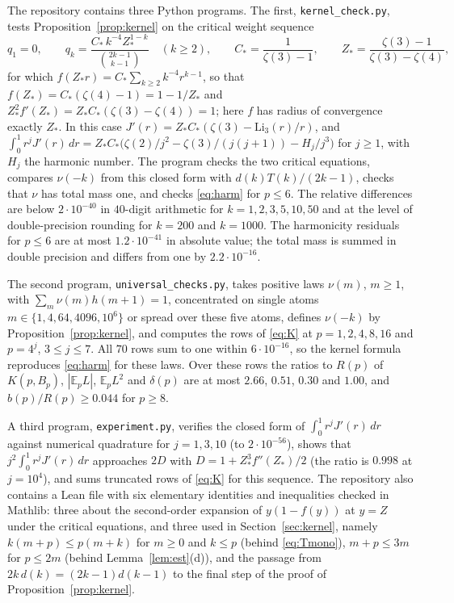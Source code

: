 \documentclass[11pt]{amsart}
\theoremstyle{remark}
\numberwithin{equation}{section}
\newcommand{\E}{\mathbb E}
\newcommand{\1}{\mathbf 1}
\begin{document}
The repository \cite{code} contains three Python programs. The first, \texttt{kernel\_check.py}, tests Proposition~\ref{prop:kernel} on the critical weight sequence
\[
q_1=0,\qquad q_k=\frac{C_*\,k^{-4}Z_*^{1-k}}{\binom{2k-1}{k-1}}\quad(k\ge2),\qquad C_*=\frac1{\zeta(3)-1},\qquad Z_*=\frac{\zeta(3)-1}{\zeta(3)-\zeta(4)},
\]
for which $f(Z_*r)=C_*\sum_{k\ge2}k^{-4}r^{k-1}$, so that $f(Z_*)=C_*(\zeta(4)-1)=1-1/Z_*$ and $Z_*^2f'(Z_*)=Z_*C_*(\zeta(3)-\zeta(4))=1$; here $f$ has radius of convergence exactly $Z_*$. In this case $J'(r)=Z_*C_*(\zeta(3)-\mathrm{Li}_3(r)/r)$, and $\int_0^1r^jJ'(r)\,dr=Z_*C_*\bigl(\zeta(2)/j^2-\zeta(3)/(j(j+1))-H_j/j^3\bigr)$ for $j\ge1$, with $H_j$ the harmonic number. The program checks the two critical equations, compares $\nu(-k)$ from this closed form with $d(k)T(k)/(2k-1)$, checks that $\nu$ has total mass one, and checks \eqref{eq:harm} for $p\le6$. The relative differences are below $2\cdot10^{-40}$ in $40$-digit arithmetic for $k=1,2,3,5,10,50$ and at the level of double-precision rounding for $k=200$ and $k=1000$. The harmonicity residuals for $p\le6$ are at most $1.2\cdot10^{-41}$ in absolute value; the total mass is summed in double precision and differs from one by $2.2\cdot10^{-16}$.

\sloppy
The second program, \texttt{universal\_checks.py}, takes positive laws $\nu(m)$, $m\ge1$, with $\sum_m\nu(m)h(m+1)=1$, concentrated on single atoms $m\in\{1,4,64,4096,10^6\}$ or spread over these five atoms, defines $\nu(-k)$ by Proposition~\ref{prop:kernel}, and computes the rows of \eqref{eq:K} at $p=1,2,4,8,16$ and $p=4^j$, $3\le j\le7$. All $70$ rows sum to one within $6\cdot10^{-16}$, so the kernel formula reproduces \eqref{eq:harm} for these laws. Over these rows the ratios to $R(p)$ of $K(p,B_p)$, $|\E_p L|$, $\E_pL^2$ and $\delta(p)$ are at most $2.66$, $0.51$, $0.30$ and $1.00$, and $b(p)/R(p)\ge0.044$ for $p\ge8$.

A third program, \texttt{experiment.py}, verifies the closed form of $\int_0^1r^jJ'(r)\,dr$ against numerical quadrature for $j=1,3,10$ (to $2\cdot10^{-56}$), shows that $j^2\int_0^1r^jJ'(r)\,dr$ approaches $2D$ with $D=1+Z_*^3f''(Z_*)/2$ (the ratio is $0.998$ at $j=10^4$), and sums truncated rows of \eqref{eq:K} for this sequence. The repository also contains a Lean file with six elementary identities and inequalities checked in Mathlib: three about the second-order expansion of $y(1-f(y))$ at $y=Z$ under the critical equations, and three used in Section~\ref{sec:kernel}, namely $k(m+p)\le p(m+k)$ for $m\ge0$ and $k\le p$ (behind \eqref{eq:Tmono}), $m+p\le3m$ for $p\le2m$ (behind Lemma~\ref{lem:est}(d)), and the passage from $2k\,d(k)=(2k-1)d(k-1)$ to the final step of the proof of Proposition~\ref{prop:kernel}.
\end{document}
